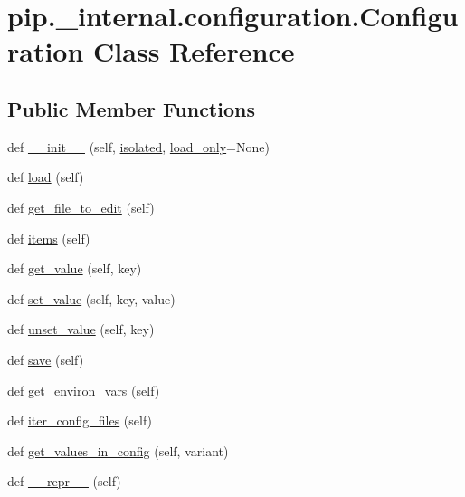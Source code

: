 \hypertarget{classpip_1_1__internal_1_1configuration_1_1Configuration}{}\section{pip.\+\_\+internal.\+configuration.\+Configuration Class Reference}
\label{classpip_1_1__internal_1_1configuration_1_1Configuration}
\subsection*{Public Member Functions}
\begin{DoxyCompactItemize}
\item 
def \hyperlink{classpip_1_1__internal_1_1configuration_1_1Configuration_a440aab98218a2ba8c937e6714f7e83e2}{\+\_\+\+\_\+init\+\_\+\+\_\+} (self, \hyperlink{classpip_1_1__internal_1_1configuration_1_1Configuration_af5ff122437dd1ea056a28fc102c1149b}{isolated}, \hyperlink{classpip_1_1__internal_1_1configuration_1_1Configuration_a12c133cf8e1ac8bd7438014a7fd26dc7}{load\+\_\+only}=None)
\item 
def \hyperlink{classpip_1_1__internal_1_1configuration_1_1Configuration_a3573a999426cabbc3e8dbc2424943d5c}{load} (self)
\item 
def \hyperlink{classpip_1_1__internal_1_1configuration_1_1Configuration_acf9e15c4e28e67a3bd2baf4062cf7fab}{get\+\_\+file\+\_\+to\+\_\+edit} (self)
\item 
def \hyperlink{classpip_1_1__internal_1_1configuration_1_1Configuration_a43a724f440f49a72db825d19c0faa921}{items} (self)
\item 
def \hyperlink{classpip_1_1__internal_1_1configuration_1_1Configuration_a1a54f03ea97464338069c2eab99296f8}{get\+\_\+value} (self, key)
\item 
def \hyperlink{classpip_1_1__internal_1_1configuration_1_1Configuration_a0ea29fbb2c910da8f45617cbd70579c4}{set\+\_\+value} (self, key, value)
\item 
def \hyperlink{classpip_1_1__internal_1_1configuration_1_1Configuration_abdb8fb0403bac7c063dcc3cfb85f9345}{unset\+\_\+value} (self, key)
\item 
def \hyperlink{classpip_1_1__internal_1_1configuration_1_1Configuration_ac5709d6e8d6b2419a67f029d2d2dde33}{save} (self)
\item 
def \hyperlink{classpip_1_1__internal_1_1configuration_1_1Configuration_a0fd53cdc1576075bf88eed44d3cacac8}{get\+\_\+environ\+\_\+vars} (self)
\item 
def \hyperlink{classpip_1_1__internal_1_1configuration_1_1Configuration_a61a09119ec40e2cf719aad5a2aa77758}{iter\+\_\+config\+\_\+files} (self)
\item 
def \hyperlink{classpip_1_1__internal_1_1configuration_1_1Configuration_ab1698426485c3193cdb05b0e0e8bcb70}{get\+\_\+values\+\_\+in\+\_\+config} (self, variant)
\item 
def \hyperlink{classpip_1_1__internal_1_1configuration_1_1Configuration_a9d9d5f17c737b7ada4090d2996b6f344}{\+\_\+\+\_\+repr\+\_\+\+\_\+} (self)
\end{DoxyCompactItemize}
